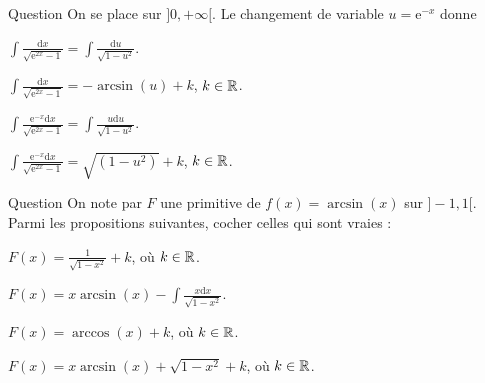 \begin{multi}[multiple,feedback=
{Avec \(u=\mathrm{e}^{-x}\), on aura : \(\mathrm{d}u=-\mathrm{e}^{-x}\mathrm{d}x\). D'où
\[\displaystyle \int \frac{\mathrm{d}x}{\sqrt{\mathrm{e}^{2x}-1}}=\int \frac{\mathrm{e}^{-x}\mathrm{d}x}{\sqrt{1-\mathrm{e}^{-2x}}}=\int \frac{-\mathrm{d}u}{\sqrt{1-u^2}}=-\arcsin(u)+k,\; k\in \Rr.\]
Et
\[\displaystyle \int \frac{\mathrm{e}^{-x}\mathrm{d}x}{\sqrt{\mathrm{e}^{2x}-1}}=\int \frac{\mathrm{e}^{-2x}\mathrm{d}x}{\sqrt{1-\mathrm{e}^{-2x}}}=\int \frac{-u\mathrm{d}u}{\sqrt{1-u^2}}=\sqrt{(1-u^2)}+k,\; k\in \Rr.\]
}]{Question}
On se place sur \(]0,+\infty[\). Le changement de variable \(u=\mathrm{e}^{-x}\) donne

    \item \(\displaystyle \int \frac{\mathrm{d}x}{\sqrt{\mathrm{e}^{2x}-1}}=\int \frac{\mathrm{d}u}{\sqrt{1-u^2}}\).
    \item* \(\displaystyle \int \frac{\mathrm{d}x}{\sqrt{\mathrm{e}^{2x}-1}}=-\arcsin (u)+k\), \(k\in \mathbb{R}\).
    \item \(\displaystyle \int \frac{\mathrm{e}^{-x}\mathrm{d}x}{\sqrt{\mathrm{e}^{2x}-1}}=\int \frac{u\mathrm{d}u}{\sqrt{1-u^2}}\).
    \item* \(\displaystyle \int \frac{\mathrm{e}^{-x}\mathrm{d}x}{\sqrt{\mathrm{e}^{2x}-1}}=\sqrt{(1-u^2)}+k\), \(k\in \mathbb{R}\).
\end{multi}


\begin{multi}[multiple,feedback=
{Une intégration par parties avec \(u=\arcsin (x)\) et \(v=x\) donne
\[F(x)=x\arcsin (x)-\int \frac{x\mathrm{d}x}{\sqrt{1-x^2}}=x\arcsin (x)+\sqrt{1-x^2}+k,\; k\in \Rr.\]
}]{Question}
On note par \(F\) une primitive de \(f(x)=\arcsin (x)\) sur \(]-1,1[\). Parmi les propositions suivantes, cocher celles qui sont vraies :

    \item \(\displaystyle F(x)=\frac{1}{\sqrt{1-x^2}}+k\), où \(k\in \mathbb{R}\).
    \item* \(\displaystyle F(x)=x\arcsin (x)-\int \frac{x\mathrm{d}x}{\sqrt{1-x^2}}\).
    \item \(\displaystyle F(x)=\arccos (x)+k\), où \(k\in \mathbb{R}\).
    \item* \(\displaystyle F(x)=x\arcsin (x)+\sqrt{1-x^2}+k\), où \(k\in \mathbb{R}\).
\end{multi}


